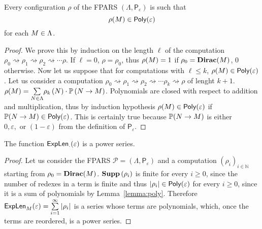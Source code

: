 \begin{lemma}\label{lemma:poly}
	Every configuration $\rho$ of the FPARS $\left(\Lambda,\mathsf{P}_{\varepsilon}\right)$ is such that
	$$
	\rho(M)\in \textsf{Poly}(\varepsilon)
	$$
	for each $M\in\Lambda$.
\end{lemma}
\begin{proof}
	We prove this by induction on the length $\ell$ of the computation $\rho_0\rightsquigarrow\rho_1\rightsquigarrow\rho_2\rightsquigarrow\cdots\rho$. If $\ell=0$, $\rho=\rho_0$, thus $\rho(M)=1$ if $\rho_0=\textbf{Dirac}(M)$, $0$ otherwise. Now let us suppose that for computations with $\ell\leq k$, $\rho(M)\in \textsf{Poly}(\varepsilon)$. Let us consider a computation $ \rho_0\rightsquigarrow\rho_1\rightsquigarrow \rho_2\rightsquigarrow\cdots\rho_{k}\rightsquigarrow\rho$ of lenght $k+1$. $\rho(M)=\underset{N\in\Lambda}{\sum}\rho_{k}\left( N\right) \cdot\mathbb{P}\left(N \rightarrow M\right)$. Polynomials are closed with respect to addition and multiplication, thus by induction hypothesis $\rho(M)\in\textsf{Poly}(\varepsilon)$ if $\mathbb{P}(N \rightarrow M)\in\textsf{Poly}(\varepsilon)$. This is certainly true because $\mathbb{P}(N \rightarrow M)$ is either $0,\varepsilon,\textrm{ or }(1-\varepsilon)$ from the definition of $\mathsf{P}_{\varepsilon}$.
\end{proof}
\begin{theorem}
	The function $\textsf{ExpLen}_{\cdot}(\varepsilon)$ is a power series.
\end{theorem}
\begin{proof}
	Let us consider the FPARS $\mathcal{P}=\left(\Lambda,\mathsf{P}_{\varepsilon}\right)$ and a computation $(\rho_i)_{i\in\mathbb{N}}$ starting from $\rho_0=\textbf{Dirac}(M)$. $\textbf{Supp}\left(\rho_i\right)$
	is finite for every $i\geq 0$, since the number of redexes in a term is finite and thus $|\rho_i|\in\textsf{Poly}(\varepsilon)$ for every $i\geq 0$, since it is a sum of polynomials by Lemma~\ref{lemma:poly}. Therefore $\textsf{ExpLen}_{M}(\varepsilon)=\sum\limits_{i=1}^{\infty} |\rho_i|$ is a series whose terms are polynomials, which, once the terms are reordered, is a power series.
\end{proof}
